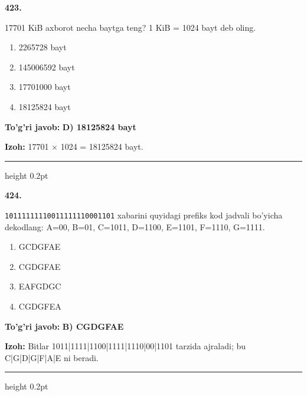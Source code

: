 \documentclass[10pt,a4paper,oneside]{article}
\begin{document}
\noindent\textbf{\color{ink}423.}
\par
17701 KiB axborot necha baytga teng? 1 KiB = 1024 bayt deb oling.
\begin{enumerate}[label=\Alph*),leftmargin=9mm]
\item 2265728 bayt
\item 145006592 bayt
\item 17701000 bayt
\item 18125824 bayt
\end{enumerate}
\begin{tcolorbox}[enhanced,breakable,colback=teal!4,colframe=teal!50!black,boxrule=0.5pt,arc=1.1mm,left=3mm,right=3mm,top=1.7mm,bottom=1.7mm,before skip=2mm,after skip=2mm]
\textbf{\color{teal}To'g'ri javob:} \textbf{D) 18125824 bayt}
\par\smallskip
\textbf{Izoh:} 17701 \ensuremath{\times} 1024 = 18125824 bayt.
\end{tcolorbox}
\vspace{2mm}\hrule height 0.2pt \vspace{3mm}

\noindent\textbf{\color{ink}424.}
\par
\texttt{10111111110011111110001101} xabarini quyidagi prefiks kod jadvali bo'yicha dekodlang: A=00, B=01, C=1011, D=1100, E=1101, F=1110, G=1111.
\begin{enumerate}[label=\Alph*),leftmargin=9mm]
\item GCDGFAE
\item CGDGFAE
\item EAFGDGC
\item CGDGFEA
\end{enumerate}
\begin{tcolorbox}[enhanced,breakable,colback=teal!4,colframe=teal!50!black,boxrule=0.5pt,arc=1.1mm,left=3mm,right=3mm,top=1.7mm,bottom=1.7mm,before skip=2mm,after skip=2mm]
\textbf{\color{teal}To'g'ri javob:} \textbf{B) CGDGFAE}
\par\smallskip
\textbf{Izoh:} Bitlar 1011|1111|1100|1111|1110|00|1101 tarzida ajraladi; bu C|G|D|G|F|A|E ni beradi.
\end{tcolorbox}
\vspace{2mm}\hrule height 0.2pt \vspace{3mm}
\end{document}
